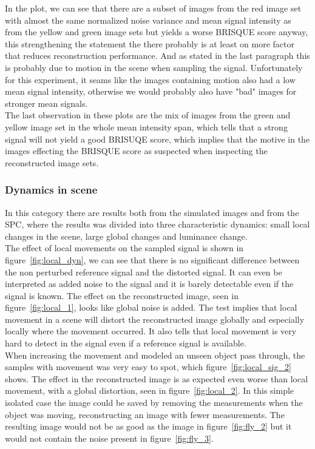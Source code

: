 In the plot, we can see that there are a subset of images from the red image set with almost the same normalized noise variance and mean signal intensity as from the yellow and green image sets but yields a worse BRISQUE score anyway, this strengthening the statement the there probably is at least on more factor that reduces reconstruction performance. And as stated in the last paragraph this is probably due to motion in the scene when sampling the signal. Unfortunately for this experiment, it seams like the images containing motion also had a low mean signal intensity, otherwise we would probably also have "bad" images for stronger mean signals.\\[0.1in] 

The last observation in these plots are the mix of images from the green and yellow image set in the whole mean intensity span, which tells that a strong signal will not yield a good BRISUQE score, which implies that the motive in the images effecting the BRISQUE score as suspected when inspecting the reconstructed image sets.

\subsubsection{Dynamics in scene}
In this category there are results both from the simulated images and from the SPC, where the results was divided into three characteristic dynamics: small local changes in the scene, large global changes and luminance change.\\[0.1in]

The effect of local movements on the sampled signal is shown in figure~\ref{fig:local_dyn}, we can see that there is no significant difference between the non perturbed reference signal and the distorted signal. It can even be interpreted as added noise to the signal and it is barely detectable even if the signal is known. The effect on the reconstructed image, seen in figure~\ref{fig:local_1}, looks like global noise is added. The test implies that local movement in a scene will distort the reconstructed image globally and especially locally where the movement occurred. It also tells that local movement is very hard to detect in the signal even if a reference signal is available.\\[0.1in]

When increasing the movement and modeled an unseen object pass through, the samples with movement was very easy to spot, which figure~\ref{fig:local_sig_2} shows. The effect in the reconstructed image is as expected even worse than local movement, with a global distortion, seen in figure~\ref{fig:local_2}. In this simple isolated case the image could be saved by removing the measurements when the object was moving, reconstructing an image with fewer measurements. The resulting image would not be as good as the image in figure~\ref{fig:fly_2} but it would not contain the noise present in figure~\ref{fig:fly_3}. \\[0.1in]


